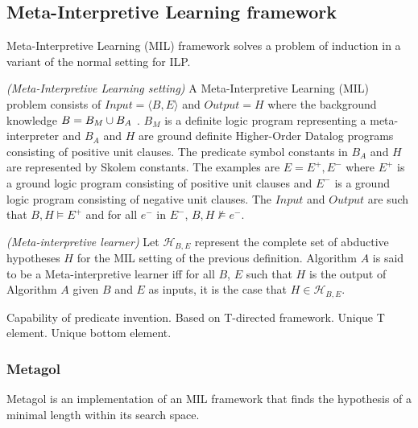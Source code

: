 \subsection{Meta-Interpretive Learning framework\cite{muggleton2013}}
Meta-Interpretive Learning (MIL) framework solves a problem of induction in a variant of the normal setting for ILP.

\begin{defn}
\emph{(Meta-Interpretive Learning setting)} A Meta-Interpretive Learning (MIL)
problem consists of $Input = \langle B, E \rangle$ and $Output =H$ where the background knowledge
$B = B_M \cup B_A$ . $B_M$ is a definite logic program representing a meta-interpreter and $B_A$ and
$H$ are ground definite Higher-Order Datalog programs consisting of positive unit clauses.
The predicate symbol constants in $B_A$ and $H$ are represented by Skolem constants. The examples are $E = E^+ , E^−$ where $E^+$ is a ground logic program consisting of positive unit
clauses and $E^−$ is a ground logic program consisting of negative unit clauses. The $Input$ and
$Output$ are such that $B, H \models E^+$ and for all $e^-$ in $E^-$, $B, H \not\models e^-$.
\end{defn}

\begin{defn}
\emph{(Meta-interpretive learner)} Let $\mathcal{H}_{B,E}$ represent the complete set of abductive
hypotheses $H$ for the MIL setting of the previous definition. Algorithm $A$ is said to be a Meta-interpretive learner iff for all $B$, $E$ such that $H$ is the output of Algorithm $A$ given $B$ and $E$
as inputs, it is the case that $H \in \mathcal{H}_{B,E}$.
\end{defn}

Capability of predicate invention.
Based on T-directed framework. Unique T element. Unique bottom element.

\subsubsection{Metagol}
Metagol is an implementation of an MIL framework that finds the hypothesis of a minimal length within its search space.

